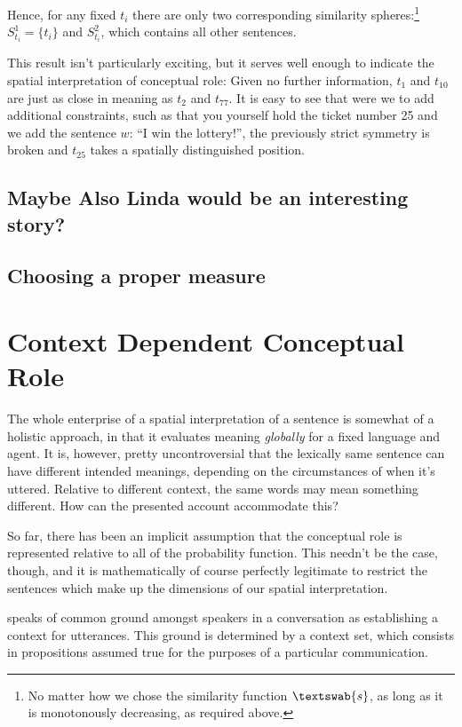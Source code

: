\documentclass[11pt, a4paper]{scrartcl}
\renewcommand{\i}[1]{\emph{#1}}
\newcommand{\m}[1]{\textswab{#1}}
\begin{document}
Hence, for any fixed $t_i$ there are only two corresponding similarity spheres:\footnote{No matter how we chose the similarity function $\m{s}$, as long as it is monotonously decreasing, as required above.} $S^1_{t_i} = \{ t_i\}$ and $S^2_{t_i}$, which contains all other sentences. 

This result isn't particularly exciting, but it serves well enough to indicate the spatial interpretation of conceptual role: Given no further information, $t_1$ and $t_{10}$ are just as close in meaning as $t_2$ and $t_{77}$. It is easy to see that were we to add additional constraints, such as that you yourself hold the ticket number 25 and we add the sentence $w$: ``I win the lottery!'', the previously strict symmetry is broken and $t_{25}$ takes a spatially distinguished position.

\subsection{Maybe Also Linda would be an interesting story?}
\subsection{Choosing a proper measure}

\section{Context Dependent Conceptual Role}

The whole enterprise of a spatial interpretation of a sentence is somewhat of a holistic approach, in that it evaluates meaning \i{globally} for a fixed language and agent. It is, however, pretty uncontroversial that the lexically same sentence can have different intended meanings, depending on the circumstances of when it's uttered. Relative to different context, the same words may mean something different. How can the presented account accommodate this? 

So far, there has been an implicit assumption that the conceptual role is represented relative to all of the probability function. This needn't be the case, though, and it is mathematically of course perfectly legitimate to restrict the sentences which make up the dimensions of our spatial interpretation. 

\textcite{Stalnaker1978-STAA-2} speaks of common ground amongst speakers in a conversation as establishing a context for utterances. This ground is determined by a context set, which consists in propositions assumed true for the purposes of a particular communication.
\end{document}
